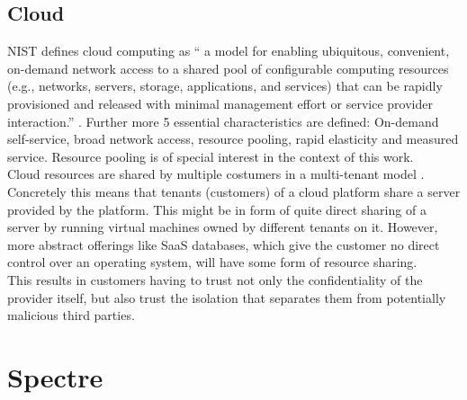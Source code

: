 \documentclass[conference,compsoc,final,a4paper]{IEEEtran}
\begin{document}
\subsection{Cloud}
\ac{NIST} defines cloud computing as \enquote{\textelp{} a model for enabling ubiquitous, convenient, on-demand network access to a shared pool of configurable computing resources (e.g., networks, servers, storage, applications, and services) that can be rapidly provisioned and released with minimal management effort or service provider interaction.} \cite{mell2011nist}. Further more 5 essential characteristics are defined: On-demand self-service, broad network access, resource pooling, rapid   elasticity and measured service. Resource pooling is of special interest in the context of this work. \\
Cloud resources are shared by multiple costumers in a multi-tenant model \cite{mell2011nist}. Concretely this means that tenants (customers) of a cloud platform share a server provided by the platform. This might be in form of quite direct sharing of a server by running virtual machines owned by different tenants on it. However, more abstract offerings like \ac{SaaS} databases, which give the customer no direct control over an operating system, will have some form of resource sharing. \\
This results in customers having to trust not only the confidentiality of the provider itself, but also trust the isolation that separates them from potentially malicious third parties.
\section{Spectre}
\end{document}
